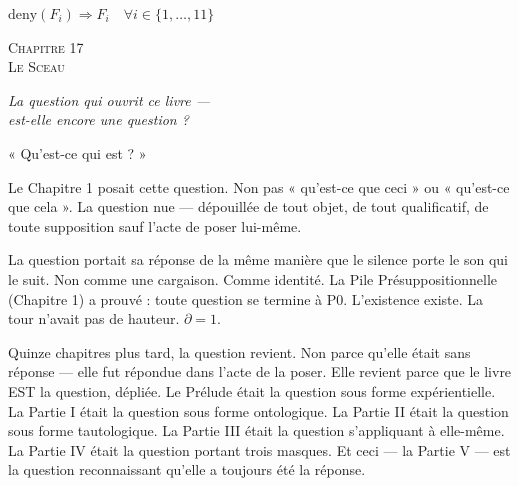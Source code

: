 \documentclass[10pt, openany, oneside]{book}
\renewcommand{\large}{\fontsize{11.5}{14}\selectfont}
\renewcommand{\huge}{\fontsize{17}{21}\selectfont}
\begin{document}
\vspace{0.5em}

\begin{center}
    $\text{deny}(F_i) \Rightarrow F_i \quad \forall i \in \{1, \ldots, 11\}$
\end{center}

%
%

\newpage

\begin{center}
    {\huge\scshape Chapitre 17}\\[0.3em]
    {\large\scshape Le Sceau}
\end{center}

\vspace{1.5em}

\begin{center}
    \itshape
    La question qui ouvrit ce livre ---\\
    est-elle encore une question ?
\end{center}

\vspace{2em}


\noindent « Qu'est-ce qui est ? »

Le Chapitre 1 posait cette question. Non pas « qu'est-ce que ceci » ou « qu'est-ce que cela ». La question nue --- dépouillée de tout objet, de tout qualificatif, de toute supposition sauf l'acte de poser lui-même.

La question portait sa réponse de la même manière que le silence porte le son qui le suit. Non comme une cargaison. Comme identité. La Pile Présuppositionnelle (Chapitre 1) a prouvé : toute question se termine à P0. L'existence existe. La tour n'avait pas de hauteur. $\partial = 1$.

Quinze chapitres plus tard, la question revient. Non parce qu'elle était sans réponse --- elle fut répondue dans l'acte de la poser. Elle revient parce que le livre EST la question, dépliée. Le Prélude était la question sous forme expérientielle. La Partie I était la question sous forme ontologique. La Partie II était la question sous forme tautologique. La Partie III était la question s'appliquant à elle-même. La Partie IV était la question portant trois masques. Et ceci --- la Partie V --- est la question reconnaissant qu'elle a toujours été la réponse.
\end{document}
